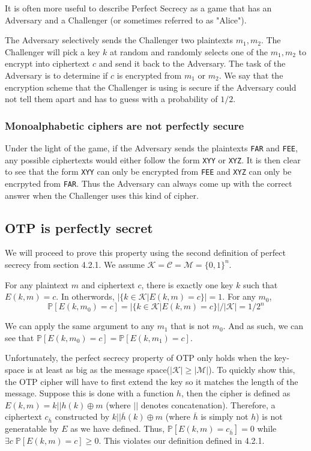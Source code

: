 \documentclass{article}
\begin{document}
\begin{multicols}{2}
It is often more useful to describe Perfect Secrecy as a game that has an Adversary and a Challenger (or sometimes referred to as "Alice").

The Adversary selectively sends the Challenger two plaintexts $m_1, m_2$. The Challenger will pick a key $k$ at random and randomly selects one of the $m_1, m_2$ to encrypt into ciphertext $c$ and send it back to the Adversary. The task of the Adversary is to determine if $c$ is encrypted from $m_1$ or $m_2$. We say that the encryption scheme that the Challenger is using is secure if the Adversary could not tell them apart and has to guess with a probability of $1/2$.

\subsubsection{Monoalphabetic ciphers are not perfectly secure}

Under the light of the game, if the Adversary sends the plaintexts \texttt{FAR} and \texttt{FEE}, any possible ciphertexts would either follow the form \texttt{XYY} or \texttt{XYZ}. It is then clear to see that the form \texttt{XYY} can only be encrypted from \texttt{FEE} and \texttt{XYZ} can only be encrpyted from \texttt{FAR}. Thus the Adversary can always come up with the correct answer when the Challenger uses this kind of cipher.

\subsection{OTP is perfectly secret}

We will proceed to prove this property using the second definition of perfect secrecy from section 4.2.1. We assume $\mathcal{K} = \mathcal{C} = \mathcal{M} = \{0,1\}^n$.

For any plaintext $m$ and ciphertext $c$, there is exactly one key $k$ such that $E(k,m) = c$. In otherwords, $|\{k \in \mathcal{K} | E(k,m) = c\}| = 1$. For any $m_0$,
$$
\mathbb{P}[E(k,m_0) = c] = |\{k \in \mathcal{K} | E(k,m) = c\}|/|\mathcal{K}| = 1/2^n
$$

We can apply the same argument to any $m_1$ that is not $m_0$. And as such, we can see that $\mathbb{P}[E(k,m_0) = c] = \mathbb{P}[E(k,m_1) = c]$.


Unfortunately, the perfect secrecy property of OTP only holds when the key-space is at least as big as the message space($|\mathcal{K}| \geq |\mathcal{M}|$). To quickly show this, the OTP cipher will have to first extend the key so it matches the length of the message. Suppose this is done with a function $h$, then the cipher is defined as $E(k,m) = k||h(k) \oplus m$ (where $||$ denotes concatenation). Therefore, a ciphertext $c_{\overline{h}}$ constructed by $k||\overline{h}(k) \oplus m$ (where $\overline{h}$ is simply not $h$) is not generatable by $E$ as we have defined. Thus, $\mathbb{P}[E(k,m) = c_{\overline{h}}] = 0$ while $\exists c\;\mathbb{P}[E(k,m) = c] \geq 0$. This violates our definition defined in 4.2.1.


\end{multicols}
\end{document}
